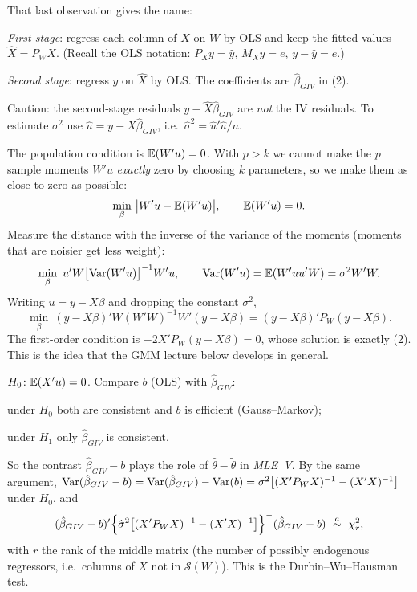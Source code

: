 \documentclass[11pt]{article}
\begin{document}
That last observation gives the name:
\begin{flatnum}
 \item \emph{First stage}: regress each column of $X$ on $W$ by OLS and keep the fitted values $\hat X=P_{W}X$.
       (Recall the OLS notation: $P_{X}y=\hat y$, $M_{X}y=e$, $y-\hat y=e$.)
 \item \emph{Second stage}: regress $y$ on $\hat X$ by OLS. The coefficients are $\hat\beta_{GIV}$ in (2).
\end{flatnum}
Caution: the second-stage residuals $y-\hat X\hat\beta_{GIV}$ are \emph{not} the IV residuals. To estimate
$\sigma^{2}$ use $\hat u=y-X\hat\beta_{GIV}$, i.e.\ $\hat\sigma^{2}=\hat u'\hat u/n$.

The population condition is $\mathbb{E}(W'u)=0$. With $p>k$ we cannot make the $p$ sample moments $W'u$
\emph{exactly} zero by choosing $k$ parameters, so we make them as close to zero as possible:
\[ \min_{\beta}\ \bigl|W'u-\mathbb{E}(W'u)\bigr| ,\qquad \mathbb{E}(W'u)=0. \]
Measure the distance with the inverse of the variance of the moments (moments that are noisier get
less weight):
\[ \min_{\beta}\ u'W\bigl[\Var(W'u)\bigr]^{-1}W'u ,\qquad \Var(W'u)=\E(W'uu'W)=\sigma^{2}W'W . \]
Writing $u=y-X\beta$ and dropping the constant $\sigma^{2}$,
\begin{equation}\tag{3}
 \min_{\beta}\ (y-X\beta)'W(W'W)^{-1}W'(y-X\beta)=(y-X\beta)'P_{W}(y-X\beta).
\end{equation}
The first-order condition is $-2X'P_{W}(y-X\beta)=0$, whose solution is exactly (2). This is the idea that
the GMM lecture below develops in general.

$H_{0}\colon \mathbb{E}(X'u)=0$. Compare $b$ (OLS) with $\hat\beta_{GIV}$:
\begin{flatlist}
 \item under $H_{0}$ both are consistent and $b$ is efficient (Gauss--Markov);
 \item under $H_{1}$ only $\hat\beta_{GIV}$ is consistent.
\end{flatlist}
So the contrast $\hat\beta_{GIV}-b$ plays the role of $\hat\theta-\tilde\theta$ in \emph{MLE~V}. By the same argument,
$\operatorname{Var}(\hat\beta_{GIV}-b)=\operatorname{Var}(\hat\beta_{GIV})-\operatorname{Var}(b)=\sigma^{2}\bigl[(X'P_{W}X)^{-1}-(X'X)^{-1}\bigr]$ under $H_{0}$, and
\[ (\hat\beta_{GIV}-b)'\Bigl\{\hat\sigma^{2}\bigl[(X'P_{W}X)^{-1}-(X'X)^{-1}\bigr]\Bigr\}^{-}(\hat\beta_{GIV}-b)
   \ \overset{a}{\sim}\ \chi^{2}_{r}, \]
with $r$ the rank of the middle matrix (the number of possibly endogenous regressors, i.e.\ columns of $X$ not
in $\mathcal S(W)$). This is the Durbin--Wu--Hausman test.
\end{document}
